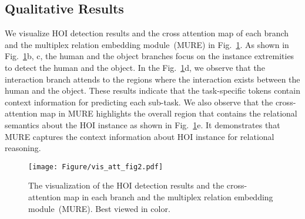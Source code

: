 \documentclass[10pt,twocolumn,letterpaper]{article}
\begin{document}
\begin{table}[!]
\begin{center}

\end{center}
\vspace{-0.4cm}
\caption{The Impact of disentangling human and object branches. MUREN-() denotes the sharing of parameters between the human and object branches across  layers. The parameters are shared only between corresponding layers.  MUREN is variant of MUREN by adjusting the number of layer .} 
\label{tab:ablation-two-branch}
\vspace{-0.5cm}
\end{table}

\subsection{Qualitative Results}
We visualize HOI detection results and the cross attention map of each branch and the multiplex relation embedding module~(MURE) in Fig.~\ref{fig:vis_att}.
As shown in Fig.~\ref{fig:vis_att}b, c, the human and the object branches focus on the instance extremities to detect the human and the object.
In the Fig.~\ref{fig:vis_att}d, we observe that the interaction branch attends to the regions where the interaction exists between the human and the object.
These results indicate that the task-specific tokens contain context information for predicting each sub-task.
We also observe that the cross-attention map in MURE highlights the overall region that contains the relational semantics about the HOI instance as shown in Fig.~\ref{fig:vis_att}e.
It demonstrates that MURE captures the context information about HOI instance for relational reasoning.








\begin{figure}[!]
\begin{center}
\texttt{[image: Figure/vis\_att\_fig2.pdf]}
\end{center}
\vspace{-0.45cm}
\caption{The visualization of the HOI detection results and the cross-attention map in each branch and the multiplex relation embedding module~(MURE). Best viewed in color.}

\vspace{-0.5cm}
\label{fig:vis_att}
\end{figure}
\end{document}
